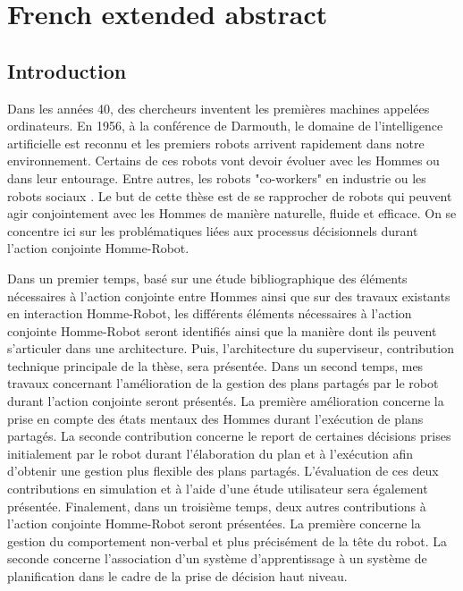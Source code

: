 \documentclass[english,a4paper,11pt,twoside]{StyleThese}
\begin{document}
\setcounter{chapter}{0} %
\dominitoc
\faketableofcontents
\fi

\chapter{French extended abstract}

\label{ch:resume}

\section{Introduction}

Dans les années 40, des chercheurs inventent les premières machines appelées ordinateurs. En 1956, à la conférence de Darmouth, le domaine de l'intelligence artificielle est reconnu et les premiers robots arrivent rapidement dans notre environnement. Certains de ces robots vont devoir évoluer avec les Hommes ou dans leur entourage. Entre autres, les robots "co-workers" en industrie ou les robots sociaux \cite{dautenhahn2007socially}. Le but de cette thèse est de se rapprocher de robots qui peuvent agir conjointement avec les Hommes de manière naturelle, fluide et efficace. On se concentre ici sur les problématiques liées aux processus décisionnels durant l'action conjointe Homme-Robot. 

Dans un premier temps, basé sur une étude bibliographique des éléments nécessaires à l'action conjointe entre Hommes ainsi que sur des travaux existants en interaction Homme-Robot, les différents éléments nécessaires à l'action conjointe Homme-Robot seront identifiés ainsi que la manière dont ils peuvent s'articuler dans une architecture. Puis, l'architecture du superviseur, contribution technique principale de la thèse, sera présentée. Dans un second temps, mes travaux concernant l'amélioration de la gestion des plans partagés par le robot durant l'action conjointe seront présentés. La première amélioration concerne la prise en compte des états mentaux des Hommes durant l'exécution de plans partagés. La seconde contribution concerne le report de certaines décisions prises initialement par le robot durant l'élaboration du plan et à l'exécution afin d'obtenir une gestion plus flexible des plans partagés. L'évaluation de ces deux contributions en simulation et à l'aide d'une étude utilisateur sera également présentée. Finalement, dans un troisième temps, deux autres contributions à l'action conjointe Homme-Robot seront présentées. La première concerne la gestion du comportement non-verbal et plus précisément de la tête du robot. La seconde concerne l'association d'un système d'apprentissage à un système de planification dans le cadre de la prise de décision haut niveau.
\end{document}
